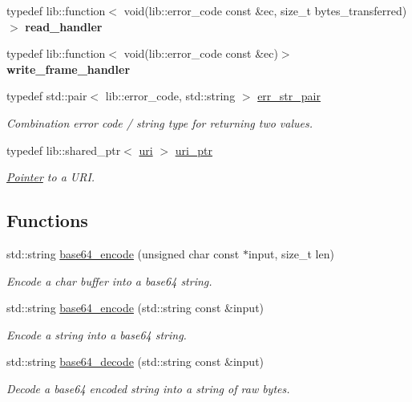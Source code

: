 \begin{DoxyCompactItemize}
typedef lib\+::function$<$ void(lib\+::error\+\_\+code const \&ec, size\+\_\+t bytes\+\_\+transferred)$>$ {\bfseries read\+\_\+handler}
\item 
\mbox{\label{namespacewebsocketpp_aeb8dee2a5b6c4f1cac6755b206581216}} 
typedef lib\+::function$<$ void(lib\+::error\+\_\+code const \&ec)$>$ {\bfseries write\+\_\+frame\+\_\+handler}
\item 
\mbox{\label{namespacewebsocketpp_abecf95d53c9387716b157daae84441f3}} 
typedef std\+::pair$<$ lib\+::error\+\_\+code, std\+::string $>$ \mbox{\hyperlink{namespacewebsocketpp_abecf95d53c9387716b157daae84441f3}{err\+\_\+str\+\_\+pair}}
\begin{DoxyCompactList}\small\item\em Combination error code / string type for returning two values. \end{DoxyCompactList}\item 
\mbox{\label{namespacewebsocketpp_aae370ea5ac83a8ece7712cb39fc23f5b}} 
typedef lib\+::shared\+\_\+ptr$<$ \mbox{\hyperlink{classwebsocketpp_1_1uri}{uri}} $>$ \mbox{\hyperlink{namespacewebsocketpp_aae370ea5ac83a8ece7712cb39fc23f5b}{uri\+\_\+ptr}}
\begin{DoxyCompactList}\small\item\em \mbox{\hyperlink{struct_pointer}{Pointer}} to a U\+RI. \end{DoxyCompactList}\end{DoxyCompactItemize}
\subsection*{Functions}
\begin{DoxyCompactItemize}
\item 
std\+::string \mbox{\hyperlink{namespacewebsocketpp_aff36d40583424a2c879df02219133af8}{base64\+\_\+encode}} (unsigned char const $\ast$input, size\+\_\+t len)
\begin{DoxyCompactList}\small\item\em Encode a char buffer into a base64 string. \end{DoxyCompactList}\item 
std\+::string \mbox{\hyperlink{namespacewebsocketpp_a3a167489f63491475d0069204edf71da}{base64\+\_\+encode}} (std\+::string const \&input)
\begin{DoxyCompactList}\small\item\em Encode a string into a base64 string. \end{DoxyCompactList}\item 
std\+::string \mbox{\hyperlink{namespacewebsocketpp_a1467174a88a2f4037c45dbeb9d57c481}{base64\+\_\+decode}} (std\+::string const \&input)
\begin{DoxyCompactList}\small\item\em Decode a base64 encoded string into a string of raw bytes. \end{DoxyCompactList}\end{DoxyCompactItemize}


